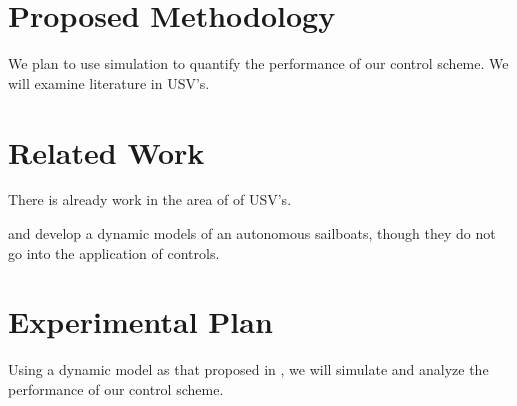 \documentclass[conference]{IEEEtran}
\begin{document}
\section{Proposed Methodology}
We plan to use simulation to quantify the performance of our control scheme. We will examine literature in USV's.
\section{Related Work}
There is already work in the area of of USV's.

\cite{Setiawan2020} and \cite{Buehler2018} develop a dynamic models of an autonomous sailboats, though they do not go into the application of controls.




\section{Experimental Plan}
Using a dynamic model as that proposed in \cite{Buehler2018}, we will simulate and analyze the performance of our control scheme. 



\end{document}
